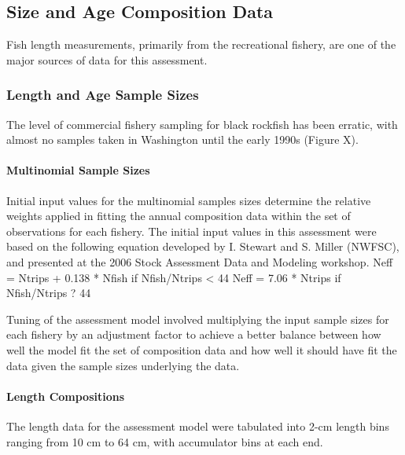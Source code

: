 \documentclass[11pt,
  english,
  letterpaper,
]{article}
\begin{document}
\hypertarget{size-and-age-composition-data}{%
\subsection{Size and Age Composition Data}\label{size-and-age-composition-data}}

Fish length measurements, primarily from the recreational fishery, are one of the major sources of data for this assessment.

\hypertarget{length-and-age-sample-sizes}{%
\subsubsection{Length and Age Sample Sizes}\label{length-and-age-sample-sizes}}

The level of commercial fishery sampling for black rockfish has been erratic, with almost no samples taken in Washington until the early 1990s (Figure X).

\hypertarget{multinomial-sample-sizes}{%
\paragraph{Multinomial Sample Sizes}\label{multinomial-sample-sizes}}

Initial input values for the multinomial samples sizes determine the relative weights applied in fitting the annual composition data within the set of observations for each fishery. The initial input values in this assessment were based on the following equation developed by I. Stewart and S. Miller (NWFSC), and presented at the 2006 Stock Assessment Data and Modeling workshop. Neff = Ntrips + 0.138 * Nfish if Nfish/Ntrips \textless{} 44 Neff = 7.06 * Ntrips if Nfish/Ntrips ? 44

Tuning of the assessment model involved multiplying the input sample sizes for each fishery by an adjustment factor to achieve a better balance between how well the model fit the set of composition data and how well it should have fit the data given the sample sizes underlying the data.

\hypertarget{length-compositions}{%
\paragraph{Length Compositions}\label{length-compositions}}

The length data for the assessment model were tabulated into 2-cm length bins ranging from 10 cm to 64 cm, with accumulator bins at each end.
\end{document}
